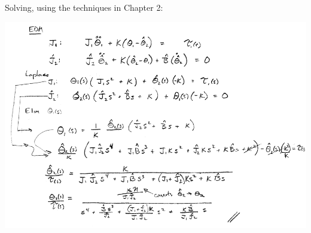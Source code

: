 \begin{ExampleCont}

Solving, using the techniques in Chapter 2:

\includegraphics[width=6.0in]{figs03/00753a.png}

\end{ExampleCont}




